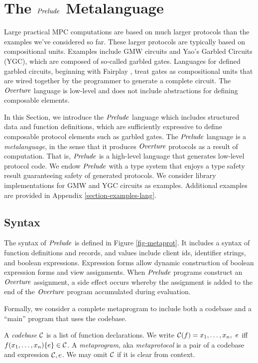 \section{The $\mathit{Prelude}$ Metalanguage}
\label{section-metalang}

Large practical MPC computations are based on much larger protocols
than the examples we've considered so far. These larger protocols are
typically based on compositional units. Examples include GMW circuits
and Yao's Garbled Circuits (YGC), which are composed of so-called
garbled gates.  Languages for defined garbled circuits, beginning with
Fairplay \cite{269581}, treat gates as compositional units that are
wired together by the programmer to generate a complete circuit. The
$\mathit{Overture}$ language is low-level and does not include abstractions for
defining composable elements.

In this Section, we introduce the $\mathit{Prelude}$ language which includes
structured data and function definitions, which are sufficiently
expressive to define composable protocol elements such as garbled
gates. The $\mathit{Prelude}$ language is a \emph{metalanguage}, in the sense
that it produces $\mathit{Overture}$ protocols as a result of computation. That
is, $\mathit{Prelude}$ is a high-level language that generates low-level
protocol code. We endow $\mathit{Prelude}$ with a type system that enjoys a
type safety result guaranteeing safety of generated protocols. We
consider library implementations for GMW and YGC circuits as
examples. Additional examples are provided in Appendix
\ref{section-examples-lang}.

\subsection{Syntax}

The syntax of $\mathit{Prelude}$ is defined in Figure
\ref{fig-metaprot}.  It includes a syntax of function
definitions and records, and values include client ids, identifier
strings, and boolean expressions. Expression forms allow dynamic
construction of boolean expression forms and view assignments. When
$\mathit{Prelude}$ programs construct an $\mathit{Overture}$ assignment, a side effect
occurs whereby the assignment is added to the end of the $\mathit{Overture}$
program accumulated during evaluation.

Formally, we consider a complete metaprogram to include both a
codebase and a ``main'' program that uses the codebase. 
\begin{definition}
A \emph{codebase} $\mathcal{C}$ is a list of function 
declarations. We write $ \mathcal{C}(f) = x_1,\ldots,x_n,\ e$
iff $f(x_1,\ldots,x_n) \{ e \} \in \mathcal{C}$.
A \emph{metaprogram}, aka \emph{metaprotocol}  is a pair of a 
codebase and expression $\mathcal{C}, e$. We may omit
$\mathcal{C}$ if it is clear from context.  
\end{definition}


